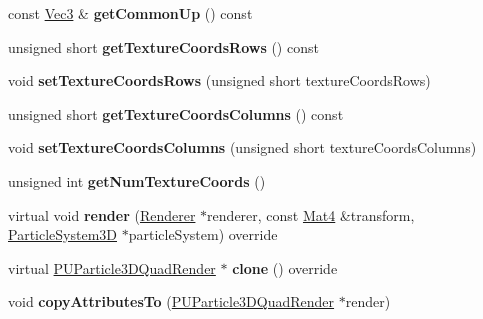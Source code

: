 \begin{DoxyCompactItemize}
\mbox{\label{classPUParticle3DQuadRender_a6e2ea2a4dccb002391f5688b39d6493f}} 
const \hyperlink{classVec3}{Vec3} \& {\bfseries get\+Common\+Up} () const
\item 
\mbox{\label{classPUParticle3DQuadRender_adf4c4a39a1fccf41eb0441fa9cda5ed4}} 
unsigned short {\bfseries get\+Texture\+Coords\+Rows} () const
\item 
\mbox{\label{classPUParticle3DQuadRender_aa2eb54e15359b351b90d25c218da9987}} 
void {\bfseries set\+Texture\+Coords\+Rows} (unsigned short texture\+Coords\+Rows)
\item 
\mbox{\label{classPUParticle3DQuadRender_a6e65fa6108475ac778ddac534068aa23}} 
unsigned short {\bfseries get\+Texture\+Coords\+Columns} () const
\item 
\mbox{\label{classPUParticle3DQuadRender_a98ca73c7ea5a6b02fbbb67de27939bb6}} 
void {\bfseries set\+Texture\+Coords\+Columns} (unsigned short texture\+Coords\+Columns)
\item 
\mbox{\label{classPUParticle3DQuadRender_a456359faf3849ccf88d37e0a77081842}} 
unsigned int {\bfseries get\+Num\+Texture\+Coords} ()
\item 
\mbox{\label{classPUParticle3DQuadRender_aa0bb12380218d222ebeaed636402cd21}} 
virtual void {\bfseries render} (\hyperlink{classRenderer}{Renderer} $\ast$renderer, const \hyperlink{classMat4}{Mat4} \&transform, \hyperlink{classParticleSystem3D}{Particle\+System3D} $\ast$particle\+System) override
\item 
\mbox{\label{classPUParticle3DQuadRender_a6ac50c58843a891e80d2b8580c826bfd}} 
virtual \hyperlink{classPUParticle3DQuadRender}{P\+U\+Particle3\+D\+Quad\+Render} $\ast$ {\bfseries clone} () override
\item 
\mbox{\label{classPUParticle3DQuadRender_a0554469267ed4b534c4718b6be8d1abb}} 
void {\bfseries copy\+Attributes\+To} (\hyperlink{classPUParticle3DQuadRender}{P\+U\+Particle3\+D\+Quad\+Render} $\ast$render)

\end{DoxyCompactItemize}
